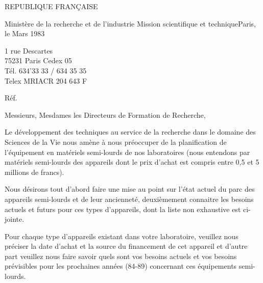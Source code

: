 REPUBLIQUE FRANÇAISE

Ministère de la recherche et de l'industrie
Mission scientifique et technique\hfill Paris, le Mars 1983

1 rue Descartes\\
75231 Paris Cedex 05\\
Tél. 634'33 33 / 634 35 35\\
Telex MRIACR 204 643 F

Réf.


Messieurs, Mesdames les Directeurs de Formation de Recherche,

Le développement des techniques au service de la recherche dans
le domaine des Sciences de la Vie nous amène à nous préoccuper de la
planification de l'équipement en matériels semi-lourds de nos laboratoires
(nous entendons par matériels semi-lourds des appareils dont le prix
d'achat est compris entre 0,5 et 5 millions de francs).

Nous désirons tout d'abord faire une mise au point sur l'état actuel
du parc des appareils semi-lourds et de leur ancienneté, deuxièmement
connaitre les besoins actuels et futurs pour ces types d'appareils, dont
la liste non exhaustive est ci-jointe.

Pour chaque type d'appareils existant dans votre laboratoire,
veuillez nous préciser la date d'achat et la source du financement de cet
appareil et d'autre part veuillez nous faire savoir quels sont vos
besoins actuels et vos besoins prévisibles pour les prochaines années
(84-89) concernant ces équipements semi-lourds.


